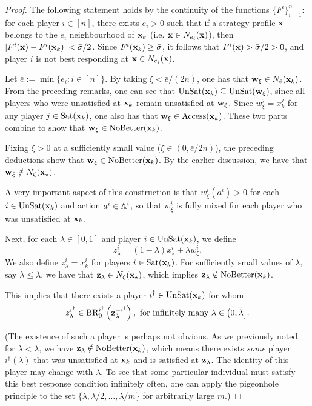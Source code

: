 \begin{proof}
{The following statement holds by the continuity of the functions $\{ F^i \}_{i = 1}^n$: for each player $i \in [n]$, there exists $e_i > 0 $ such that if a strategy profile $\bx$ belongs to the $e_i$ neighbourhood of $\bx_k$ (i.e. $\bx \in N_{e_i} ( \bx )$), then $| F^i ( \bx ) - F^i ( \bx_k ) | < \bar{\sigma} / 2$. Since $F^i ( \bx_k ) \geq \bar{\sigma}$, it follows that $F^i ( \bx ) > \bar{\sigma}/2 > 0$, and player $i$ is not best responding at $\bx \in N_{e_i} ( \bx ) $.

Let $\bar{e} := \min\{ e_i : i \in [n] \} $. By taking $\xi < \bar{e}/(2n)$, one has that $\bw_{\xi} \in N_{ \bar{e}  } ( \bx_k ) $. From the preceding remarks, one can see that $\UnSat( \bx_k ) \subseteq \UnSat(\bw_{\xi})$, since all players who were unsatisfied at $\bx_k$ remain unsatisfied at $\bw_{\xi}$. Since $w^j_{\xi} = x^j_k$ for any player $j \in \Sat( \bx_k )$, one also has that $\bw_{\xi} \in \Acc ( \bx_k )$. These two parts combine to show that $\bw_{\xi} \in \NoBetter ( \bx_ k )$.
}

Fixing $\xi > 0$ at a sufficiently small value ($\xi \in (0, \bar{e}/2n)$), the preceding deductions show that $\bw_{\xi} \in \NoB(\bx_k)$. By the earlier discussion, we have that $\bw_{\xi} \notin N_{\zeta} ( \bx_{\star})$. 

A very important aspect of this construction is that $w^i_{\xi} ( a^i) > 0$ for each $i \in \UnSat(\bx_k)$ and action $a^i \in \aa^i$, so that $w^i_{\xi}$ is fully mixed for each player who was unsatisfied at $\bx_k$.

Next, for each $\lambda \in [0,1]$ and player $i \in \UnSat(\bx_k)$, we define
\[
z^i_{\lambda} = (1-\lambda) x^i_{\star} + \lambda w^i_{\xi} .
\]
We also define $z^i_{\lambda} = x^i_k$ for players $i \in \Sat(\bx_k)$. For sufficiently small values of $\lambda$, say $\lambda \leq \bar{\lambda}$, we have that $\bz_{\lambda} \in N_{\zeta}(\bx_{\star})$, which implies $\bz_{\lambda} \notin \NoB(\bx_k)$. 

This implies that there exists a player $i^{\dagger} \in \UnSat(\bx_k)$ for whom
\[
z^{i^{\dagger}}_{\lambda} \in \BR^{i^{\dagger}}_0 \left( \bz^{-i^{\dagger}}_\lambda \right), \text{ for infinitely many } \lambda \in \big( 0, \bar{\lambda} \big] . 
\]

(The existence of such a player is perhaps not obvious. As we previously noted, for $\lambda < \bar{\lambda}$, we have $\bz_{\lambda} \notin \NoB(\bx_k)$, which means there exists \emph{some} player $i^{\dagger}(\lambda)$ that was unsatisfied at $\bx_k$ and is satisfied at $\bz_{\lambda}$. The identity of this player may change with $\lambda$. To see that some particular individual must satisfy this best response condition infinitely often, one can apply the pigeonhole principle to the set $\{ \bar{\lambda}, \bar{\lambda}/2, \dots, \bar{\lambda}/m \}$ for arbitrarily large $m$.)


\end{proof}
